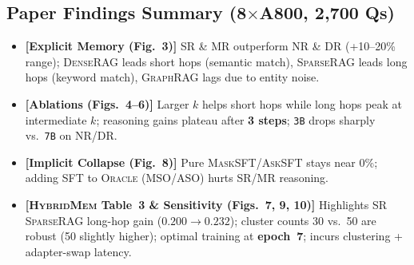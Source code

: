 \documentclass[sigconf,nonacm,10pt]{acmart}
\newcommand{\guide}[1]{\textcolor{GuideBorder}{\textbf{[#1]}}}
\begin{document}
\subsection{Paper Findings Summary (8$\times$A800, 2,700 Qs)}
\begin{itemize}[leftmargin=*, nosep, topsep=2pt]
  \item \guide{Explicit Memory (Fig.\ 3)} \textsc{SR} \& \textsc{MR} outperform \textsc{NR} \& \textsc{DR} (+10--20\% range); \textsc{DenseRAG} leads short hops (semantic match), \textsc{SparseRAG} leads long hops (keyword match), \textsc{GraphRAG} lags due to entity noise.
  \item \guide{Ablations (Figs.\ 4--6)} Larger $k$ helps short hops while long hops peak at intermediate $k$; reasoning gains plateau after \textbf{3 steps}; \texttt{3B} drops sharply vs.\ \texttt{7B} on \textsc{NR}/\textsc{DR}.
  \item \guide{Implicit Collapse (Fig.\ 8)} Pure \textsc{MaskSFT}/\textsc{AskSFT} stays near 0\%; adding SFT to \textsc{Oracle} (\textsc{MSO}/\textsc{ASO}) hurts \textsc{SR}/\textsc{MR} reasoning.
  \item \guide{\textsc{HybridMem} Table~3 \& Sensitivity (Figs.\ 7, 9, 10)} Highlights \textsc{SR} \textsc{SparseRAG} long-hop gain ($0.200 \rightarrow 0.232$); cluster counts 30 vs.\ 50 are robust (50 slightly higher); optimal training at \textbf{epoch~7}; incurs clustering + adapter-swap latency.
\end{itemize}
\end{document}
